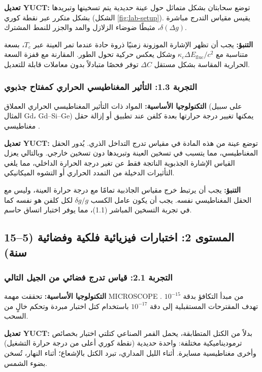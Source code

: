 \documentclass[11pt,a4paper]{article}
\begin{document}
	\textbf{تعديل YUCT:} توضع سحابتان بشكل متماثل حول عينة حديدية يتم تسخينها وتبريدها بشكل متكرر عبر نقطة كوري (الشكل \ref{fig:lab-setup}). يقيس مقياس التدرج مباشرة $\delta(\Delta g)$، مثبطًا ضوضاء الزلازل والمد والجزر للنمط المشترك.
	
	\textbf{التنبؤ:} يجب أن تظهر الإشارة الموزونة زمنيًا ذروة حادة عندما تمر العينة عبر $T_c$، بسعة متناسبة مع $\kappa_c \Delta E_{\mathrm{fluc}}/c^2$ وشكل يعكس حركية تحول الطور. المقارنة مع قفزة السعة الحرارية المقاسة بشكل مستقل $\Delta C$ توفر فحصًا متبادلاً بدون معاملات قابلة للتعديل.
	
	\subsubsection{التجربة 1.3: التأثير المغناطيسي الحراري كمفتاح جذبوي}
	
	\textbf{التكنولوجيا الأساسية:} المواد ذات التأثير المغناطيسي الحراري العملاق (على سبيل المثال Gd، Gd–Si–Ge) يمكنها تغيير درجة حرارتها بعدة كلفن عند تطبيق أو إزالة حقل مغناطيسي \cite{Gschneidner1999}.
	
	\textbf{تعديل YUCT:} توضع عينة من هذه المادة في مقياس تدرج التداخل الذري. يُدور الحقل المغناطيسي، مما يتسبب في تسخين العينة وتبريدها دون تسخين خارجي. وبالتالي يعزل القياس الإشارة الجذبوية الناتجة فقط عن تغير درجة الحرارة الداخلي، مما يلغي التأثيرات الدخيلة من التمدد الحراري أو التشوه الميكانيكي.
	
	\textbf{التنبؤ:} يجب أن يرتبط خرج مقياس الجاذبية تمامًا مع درجة حرارة العينة، وليس مع الحقل المغناطيسي نفسه. يجب أن يكون عامل الكسب $\delta g/g$ لكل كلفن هو نفسه كما في تجربة التسخين المباشر (1.1)، مما يوفر اختبار اتساق حاسم.
	
	\subsection{المستوى 2: اختبارات فيزيائية فلكية وفضائية (5–15 سنة)}
	\label{subsec:space-tests}
	
	\subsubsection{التجربة 2.1: قياس تدرج فضائي من الجيل التالي}
	
	\textbf{التكنولوجيا الأساسية:} تحققت مهمة MICROSCOPE من مبدأ التكافؤ بدقة $10^{-15}$ \cite{Touboul2022}. تهدف المقترحات المستقبلية إلى دقة $10^{-17}$ باستخدام كتل اختبار مبردة وتحكم خالٍ من السحب.
	
	\textbf{تعديل YUCT:} بدلاً من الكتل المتطابقة، يحمل القمر الصناعي كتلتي اختبار بخصائص ترموديناميكية مختلفة: واحدة حديدية (نقطة كوري أعلى من درجة حرارة التشغيل) وأخرى مغناطيسية مسايرة. أثناء الليل المداري، تبرد الكتل بالإشعاع؛ أثناء النهار، تُسخن بضوء الشمس.
	
\end{document}
